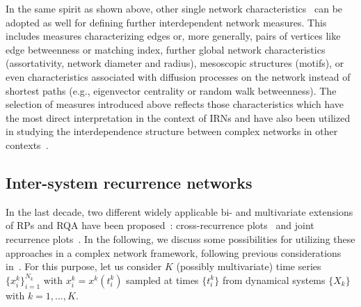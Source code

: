 		In the same spirit as shown above, other single network characteristics~\cite{Boccaletti2006,Costa2007} can be adopted as well for defining further interdependent network measures. This includes measures characterizing edges or, more generally, pairs of vertices like edge betweenness or matching index, further global network characteristics (assortativity, network diameter and radius), mesoscopic structures (motifs), or even characteristics associated with diffusion processes on the network instead of shortest paths (e.g., eigenvector centrality or random walk betweenness). The selection of measures introduced above reflects those characteristics which have the most direct interpretation in the context of IRNs and have also been utilized in studying the interdependence structure between complex networks in other contexts~\cite{Donges2011b,Wiedermann2013}. %


	\subsection{Inter-system recurrence networks} \label{sec:IntSRN}
	In the last decade, two different widely applicable bi- and multivariate extensions of RPs and RQA have been proposed~\cite{marwan2007}: cross-recurrence plots~\cite{marwan2002,Zbilut1998} and joint recurrence plots~\cite{romano2004}. In the following, we discuss some possibilities for utilizing these approaches in a complex network framework, following previous considerations in~\cite{Feldhoff2011,Feldhoff2012,Feldhoff2013}. For this purpose, let us consider $K$ (possibly multivariate) time series $\{x_i^k\}_{i=1}^{N_k}$ with $x_i^k=x^k(t^k_i)$ sampled at times $\{t^k_i\}$ from dynamical systems $\{X_k\}$ with $k=1,\dots,K$. 
		
